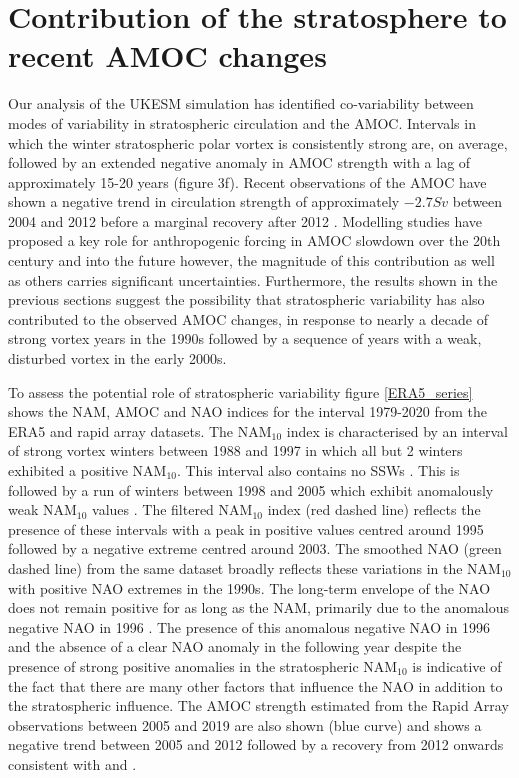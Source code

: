 \section{Contribution of the stratosphere to recent AMOC changes}
Our analysis of the UKESM simulation has identified co-variability between modes of variability in stratospheric circulation and the AMOC. Intervals in which the winter stratospheric polar vortex is consistently strong are, on average, followed by an extended negative anomaly in AMOC strength with a lag of approximately 15-20 years (figure 3f). Recent observations of the AMOC have shown a negative trend in circulation strength of approximately $-2.7 Sv$ between 2004 and 2012 \citep{smeedNorth2018} before a marginal recovery after 2012 \citep{smeedAtlantic2019}. Modelling studies have proposed a key role for anthropogenic forcing in AMOC slowdown over the 20th century and into the future \cite{liuOverlooked2017, bakkerFate2016, liuMechanisms2019} however, the magnitude of this contribution as well as others carries significant uncertainties. Furthermore, the results shown in the previous sections suggest the possibility that stratospheric variability has also contributed to the observed AMOC changes, in response to nearly a decade of strong vortex years in the 1990s followed by a sequence of years with a weak, disturbed vortex in the early 2000s. 

To assess the potential role of stratospheric variability figure \ref{ERA5_series} shows  the NAM, AMOC and NAO indices for the interval 1979-2020 from the ERA5 and rapid array datasets. The NAM$_{10}$ index is characterised by an interval of strong vortex winters between 1988 and 1997 in which all but 2 winters exhibited a positive NAM$_{10}$. This interval also contains no SSWs \citep{pawsonCold1999}. This is followed by a run of winters between 1998 and 2005 which exhibit anomalously weak NAM$_{10}$ values \cite{manneyRemarkable2005}. The filtered NAM$_{10}$ index (red dashed line) reflects the presence of these intervals with a peak in positive values centred around 1995 followed by a negative extreme centred around 2003. The smoothed NAO (green dashed line) from the same dataset broadly reflects these variations in the NAM$_{10}$ with positive NAO extremes in the 1990s. The long-term envelope of the NAO does not remain positive for as long as the NAM, primarily due to the anomalous negative NAO in 1996 \citep{halpertClimate1997}. The presence of this anomalous negative NAO in 1996 and the absence of a clear NAO anomaly in the following year despite the presence of strong positive anomalies in the stratospheric NAM$_{10}$ is indicative of the fact that there are many other factors that influence the NAO in addition to the stratospheric influence. The AMOC strength estimated from the Rapid Array observations between 2005 and 2019 are also shown (blue curve) and shows a negative trend between 2005 and 2012 followed by a recovery from 2012 onwards consistent with \cite{smeedNorth2018} and \cite{smeedAtlantic2019}. 

